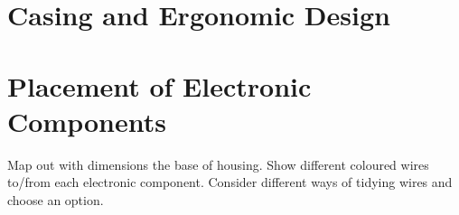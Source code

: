 
\section{Casing and Ergonomic Design}
\label{seccasing_and_ergonomic_design}


\section{Placement of Electronic Components}
\label{secplacement_of_electronic_components}

Map out with dimensions the base of housing. Show different coloured wires to/from each electronic component. Consider different ways of tidying wires and choose an option.

